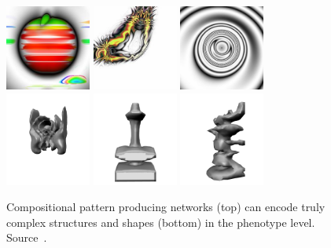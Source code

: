 \begin{figure}[t!]
\centering
\includegraphics[width=0.25\textwidth]{../Figures/Misc/picBreed3.jpg}\quad   
\includegraphics[width=0.25\textwidth]{../Figures/Misc/picBreed2.jpg}\quad
\includegraphics[width=0.25\textwidth]{../Figures/Misc/picBreed1.jpg}\\
\includegraphics[width=0.25\textwidth]{../Figures/Misc/endless2.png}\quad 
\includegraphics[width=0.25\textwidth]{../Figures/Misc/endless1.png}\quad
\includegraphics[width=0.25\textwidth]{../Figures/Misc/endless3.png}
\caption{Compositional pattern producing networks (top) can encode truly complex structures and shapes (bottom) in the phenotype level. Source~\cite{picbreederSite}.}
\label{fig:cppnImages}
\end{figure}

